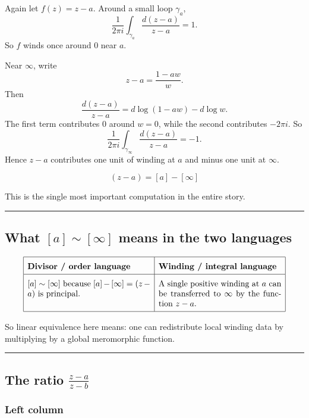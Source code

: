 \documentclass[11pt]{article}
\begin{document}
	Again let \(f(z)=z-a\). Around a small loop \(\gamma_a\),
	\[
	\frac{1}{2\pi i}\int_{\gamma_a}\frac{d(z-a)}{z-a}=1.
	\]
	So \(f\) winds once around \(0\) near \(a\).
	
	Near \(\infty\), write
	\[
	z-a=\frac{1-aw}{w}.
	\]
	Then
	\[
	\frac{d(z-a)}{z-a}=d\log(1-aw)-d\log w.
	\]
	The first term contributes \(0\) around \(w=0\), while the second contributes \(-2\pi i\). So
	\[
	\frac{1}{2\pi i}\int_{\gamma_\infty}\frac{d(z-a)}{z-a}=-1.
	\]
	Hence \(z-a\) contributes one unit of winding at \(a\) and minus one unit at \(\infty\).
	
	\bigskip
	
	\[
	\boxed{(z-a)=[a]-[\infty]}
	\]
	
	\bigskip
	
	This is the single most important computation in the entire story.
	
	\bigskip
	\hrule
	\bigskip
	
	\subsection*{What \texorpdfstring{$[a]\sim[\infty]$}{[a]~[infinity]} means in the two languages}
	
	\[
	\renewcommand{\arraystretch}{1.7}
	\begin{array}{|p{0.43\textwidth}|p{0.43\textwidth}|}
		\hline
		\textbf{Divisor / order language} & \textbf{Winding / integral language} \\
		\hline
		\([a]\sim [\infty]\) because \([a]-[\infty]=(z-a)\) is principal. &
		A single positive winding at \(a\) can be transferred to \(\infty\) by the function \(z-a\). \\
		\hline
	\end{array}
	\]
	
	So linear equivalence here means: one can redistribute local winding data by multiplying by a global meromorphic function.
	
	\bigskip
	\hrule
	\bigskip
	
	\subsection*{The ratio \texorpdfstring{$\frac{z-a}{z-b}$}{(z-a)/(z-b)}}
	
	\subsubsection*{Left column}
	
\end{document}
